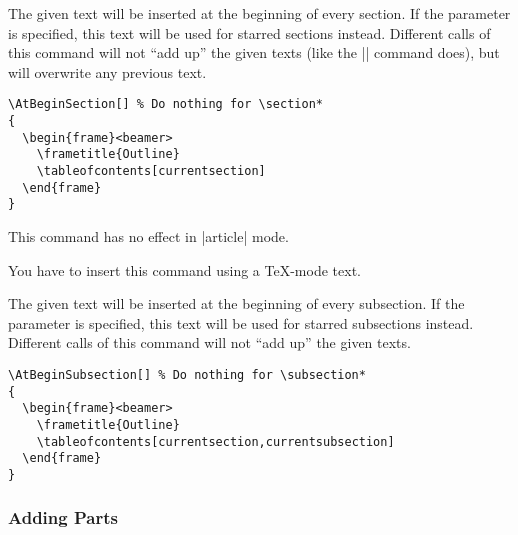 \begin{command}{\AtBeginSection{}}
  The given text will be inserted at the beginning of every
  section. If the  parameter is specified,
  this text will be used for starred sections instead. Different calls
  of this command will not ``add up'' the given texts (like the
  |\AtBeginDocument| command does), but will  overwrite any previous
  text. 
  
  \example
\begin{verbatim}
\AtBeginSection[] % Do nothing for \section*
{
  \begin{frame}<beamer>
    \frametitle{Outline}
    \tableofcontents[currentsection]
  \end{frame}
}
\end{verbatim}

  \articlenote
  This command has no effect in |article| mode.

  \lyxnote
  You have to insert this command using a \TeX-mode text.
\end{command}


\begin{command}{\AtBeginSubsection{}}
  The given text will be inserted at the beginning of every
  subsection. If the  parameter is specified,
  this text will be used for starred subsections instead. Different calls
  of this command will not ``add up'' the given texts.
  
  \example
\begin{verbatim}
\AtBeginSubsection[] % Do nothing for \subsection*
{
  \begin{frame}<beamer>
    \frametitle{Outline}
    \tableofcontents[currentsection,currentsubsection]
  \end{frame}
}
\end{verbatim}
\end{command}




\subsubsection{Adding Parts}

